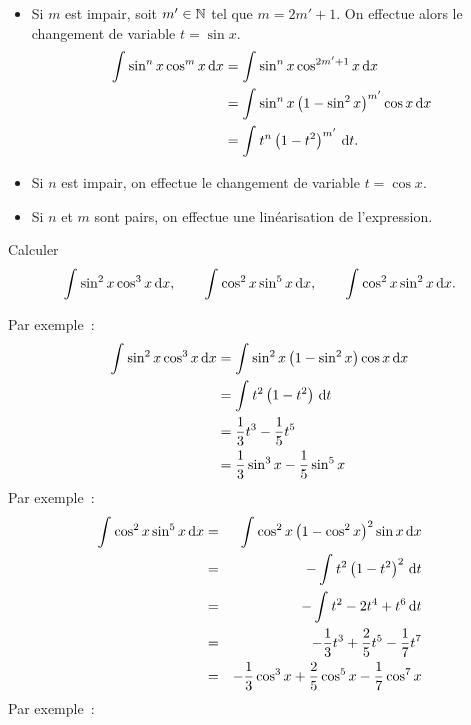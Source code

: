 \documentclass{magnolia}
\begin{document}
\begin{itemize}
  \begin{itemize}
  \item Si $m$ est impair, soit $m'\in\mathbb{N}$ tel que $m=2m'+1$. On effectue alors
    le changement de variable $t=\sin x$.
    \begin{equation*}
    \begin{split}
    \int_{}^{} \sin^n x\cos^m x\,\text{d}x&=\int_{}^{} \sin^n x \cos^{2m'+1} x\,\text{d}x\\
                              &=\int_{}^{} \sin^n x \left(1-\sin^2 x\right)^{m'}\cos x\,\text{d}x\\
                              &=\int_{}^{} t^n\left(1-t^2\right)^{m'}\,\text{d}t.
    \end{split}
    \end{equation*}
  \item Si $n$ est impair, on effectue le changement de variable $t=\cos x$.
  \item Si $n$ et $m$ sont pairs, on effectue une linéarisation de
    l'expression. 
  \end{itemize}
\begin{exoUnique}
\exo Calculer
  \[\int_{}^{} \sin^2 x\cos^3 x\,\text{d}x, \qquad \int_{}^{} \cos^2 x\sin^5 x\,\text{d}x, \qquad
    \int_{}^{} \cos^2 x\sin^2 x\,\text{d}x.\]
    \begin{sol}
  Par exemple~:
    \begin{equation*}
    \begin{split}
    \int_{}^{} \sin^2 x\cos^3 x\,\text{d}x&=\int_{}^{} \sin^2 x \left(1-\sin^2 x\right)\cos x\,\text{d}x\\
                              &=\int_{}^{} t^2\left(1-t^2\right)\,\text{d}t\\
                              &=\frac{1}{3}t^3-\frac{1}{5}t^5\\
                              &=\frac{1}{3}\sin^3 x-\frac{1}{5}\sin^5 x\\
    \end{split}
    \end{equation*}    
     Par exemple~:
    \begin{eqnarray*}
    \int_{}^{} \cos^2 x\sin^5 x\,\text{d}x&=&\int_{}^{} \cos^2 x\left(1-\cos^2 x\right)^2\sin x\,\text{d}x\\
      &=&-\int_{}^{} t^2\left(1-t^2\right)^2\,\text{d}t\\
      &=&-\int_{}^{} t^2-2t^4+t^6\,\text{d}t\\
      &=&-\frac{1}{3}t^3+\frac{2}{5}t^5-\frac{1}{7}t^7\\
      &=&-\frac{1}{3}\cos^3 x+\frac{2}{5}\cos^5 x-\frac{1}{7}\cos^7 x
    \end{eqnarray*}
Par exemple~:
    \begin{eqnarray*}

\end{eqnarray*}
\end{sol}
\end{exoUnique}
\end{itemize}
\end{document}
